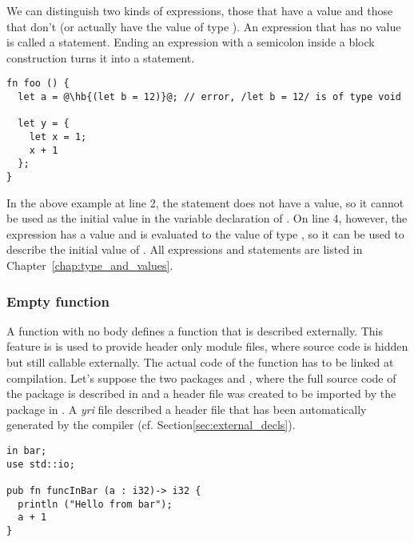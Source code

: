 We can distinguish two kinds of expressions, those that have a value and those
that don't (or actually have the value  of type ). An
expression that has no value is called a statement. Ending an expression with a
semicolon inside a block construction turns it into a statement.

\begin{lstlisting}[style=coloredverbatim, escapechar=@]
fn foo () {
  let a = @\hb{(let b = 12)}@; // error, /let b = 12/ is of type void

  let y = {
    let x = 1;
    x + 1
  };
}
\end{lstlisting}

In the above example at line 2, the statement  does not have
a value, so it cannot be used as the initial value in the variable declaration
of . On line 4, however, the expression 
has a value and is evaluated to the value  of type , so it
can be used to describe the initial value of . All expressions and
statements are listed in Chapter~\ref{chap:type_and_values}.

\subsubsection*{Empty function}

A function with no body defines a function that is described externally. This
feature is is used to provide header only module files, where source code is
hidden but still callable externally. The actual code of the function has to be
linked at compilation. Let's suppose the two packages  and
, where the full source code of the package  is
described in  and a header file was created to be
imported by the package  in . A
\textit{yri} file described a header file that has been automatically generated
by the compiler (cf. Section\ref{sec:external_decls}).


\begin{lstlisting}[caption=\textit{./bar/src/bar.yr}, style=coloredverbatim]
in bar;
use std::io;

pub fn funcInBar (a : i32)-> i32 {
  println ("Hello from bar");
  a + 1
}
\end{lstlisting}

